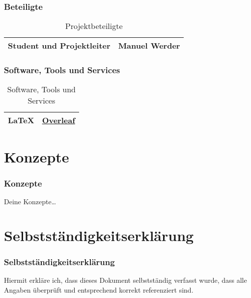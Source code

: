 \begin{frame}[fragile]
    \frametitle<presentation>{Beteiligte}
    \begin{table}[h!]
        \centering
        \begin{tabularx}{0.8\textwidth} {
        | >{\raggedright\arraybackslash}X
        | >{\raggedright\arraybackslash}X | }
            \hline
            Student und Projektleiter & Manuel Werder \\
            \hline
        \end{tabularx}
        \caption{Projektbeteiligte}
        \label{tab:1}
    \end{table}
\end{frame}

\begin{frame}[fragile]
    \frametitle<presentation>{Software, Tools und Services}
    \begin{table}[h!]
        \centering
        \begin{tabularx}{0.8\textwidth} {
        | >{\raggedright\arraybackslash}X
        | >{\raggedright\arraybackslash}X | }
            \hline
            \LaTeX & \href{https://www.overleaf.com}{Overleaf} \\
            \hline
        \end{tabularx}
        \caption{Software, Tools und Services}
        \label{tab:2}
    \end{table}
\end{frame}



\section{Konzepte}\label{sec:konzepte}
\begin{frame}[fragile]
    \frametitle<presentation>{Konzepte}
    Deine Konzepte\ldots
\end{frame}



\section{Selbstständigkeitserklärung}\label{sec:ssk}
\begin{frame}[fragile]
    \frametitle<presentation>{Selbstständigkeitserklärung}
    Hiermit erkläre ich, dass dieses Dokument selbstständig verfasst wurde, dass alle Angaben
    überprüft und entsprechend korrekt referenziert sind.
    \gitAuthorDate~\gitAuthorName
\end{frame}


